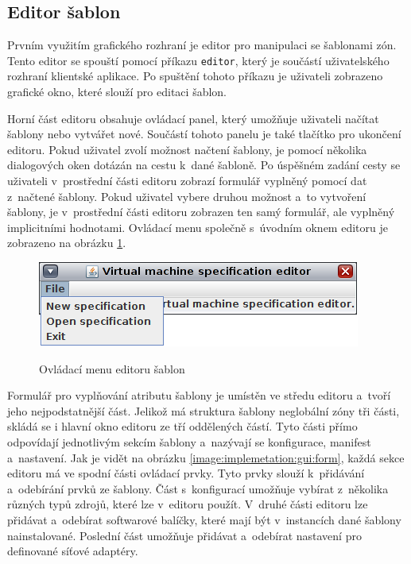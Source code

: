 \subsection{Editor šablon}
\label{chapter:implementation:gui:editor}
Prvním využitím grafického rozhraní je editor pro manipulaci se šablonami zón. Tento editor se spouští pomocí příkazu \verb|editor|,
který je součástí uživatelského rozhraní klientské aplikace. Po spuštění tohoto příkazu je uživateli zobrazeno grafické okno,
které slouží pro editaci šablon.

Horní část editoru obsahuje ovládací panel, který umožňuje uživateli načítat šablony nebo vytvářet nové. Součástí tohoto panelu
je také tlačítko pro ukončení editoru. Pokud uživatel zvolí možnost načtení šablony, je pomocí několika dialogových oken dotázán
na cestu k~dané šabloně. Po úspěšném zadání cesty se uživateli v~prostřední části editoru zobrazí formulář vyplněný pomocí
dat z~načtené šablony. Pokud uživatel vybere druhou možnost a~to vytvoření šablony, je v~prostřední části editoru zobrazen 
ten samý formulář, ale vyplněný implicitními hodnotami. Ovládací menu společně s~úvodním oknem editoru je zobrazeno na 
obrázku \ref{image:implemetation:gui:menu}.
\begin{figure}
    \centering    
    \caption{Ovládací menu editoru šablon}
    \includegraphics[scale=0.9]{assets/pdfs/implemetation_gui_menu.png}
    \label{image:implemetation:gui:menu}
\end{figure}
Formulář pro vyplňování atributu šablony je umístěn ve středu editoru a~tvoří jeho nejpodstatnější část. Jelikož má struktura 
šablony neglobální zóny tři části, skládá se i hlavní okno editoru ze tří oddělených částí. Tyto části přímo odpovídají jednotlivým
sekcím šablony a~nazývají se konfigurace, manifest a~nastavení. Jak je vidět na obrázku \ref{image:implemetation:gui:form}, každá
sekce editoru má ve spodní části ovládací prvky. Tyto prvky slouží k~přidávání a~odebírání prvků ze šablony. Část s~konfigurací
umožňuje vybírat z~několika různých typů zdrojů, které lze v~editoru použít. V~druhé části editoru lze přidávat a~odebírat
softwarové balíčky, které mají být v~instancích dané šablony nainstalované. Poslední část umožňuje přidávat a~odebírat nastavení
pro definované síťové adaptéry.

